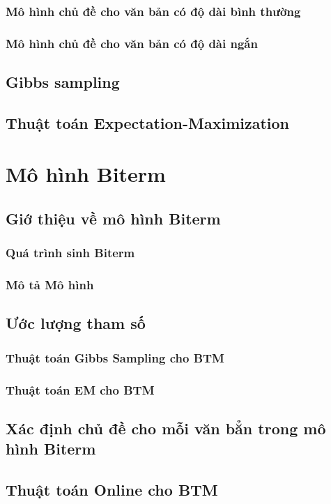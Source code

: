 \documentclass[fontsize=13pt]{scrartcl}
\begin{document}
\subsubsection{Mô hình chủ đề cho văn bản có độ dài bình thường}
\subsubsection{Mô hình chủ đề cho văn bản có độ dài ngắn}
\subsection{Gibbs sampling}
\subsection{Thuật toán Expectation-Maximization}
\section{Mô hình Biterm}
\subsection{Giớ thiệu về mô hình Biterm}
\subsubsection{Quá trình sinh Biterm}
\subsubsection{Mô tả Mô hình}
\subsection{Ước lượng tham số}
\subsubsection{Thuật toán Gibbs Sampling cho BTM}
\subsubsection{Thuật toán EM cho BTM}
\subsection{Xác định chủ đề cho mỗi văn bẳn trong mô hình Biterm}
\subsection{Thuật toán Online cho BTM}
\end{document}
